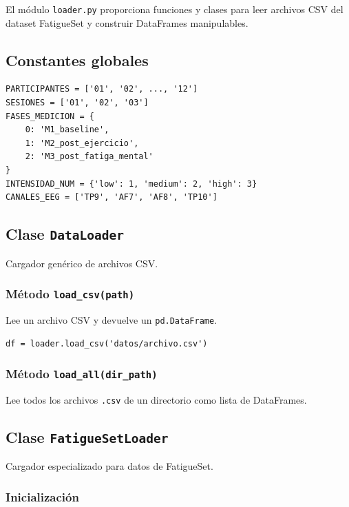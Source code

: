 \documentclass[12pt,a4paper]{article}
\begin{document}
El módulo \texttt{loader.py} proporciona funciones y clases para leer archivos CSV del dataset FatigueSet y construir DataFrames manipulables.

\subsection{Constantes globales}

\begin{lstlisting}
PARTICIPANTES = ['01', '02', ..., '12']
SESIONES = ['01', '02', '03']
FASES_MEDICION = {
    0: 'M1_baseline',
    1: 'M2_post_ejercicio',
    2: 'M3_post_fatiga_mental'
}
INTENSIDAD_NUM = {'low': 1, 'medium': 2, 'high': 3}
CANALES_EEG = ['TP9', 'AF7', 'AF8', 'TP10']
\end{lstlisting}

\subsection{Clase \texttt{DataLoader}}

Cargador genérico de archivos CSV.

\subsubsection{Método \texttt{load\_csv(path)}}

Lee un archivo CSV y devuelve un \texttt{pd.DataFrame}.

\begin{lstlisting}
df = loader.load_csv('datos/archivo.csv')
\end{lstlisting}

\subsubsection{Método \texttt{load\_all(dir\_path)}}

Lee todos los archivos \texttt{.csv} de un directorio como lista de DataFrames.

\subsection{Clase \texttt{FatigueSetLoader}}

Cargador especializado para datos de FatigueSet.

\subsubsection{Inicialización}
\end{document}
